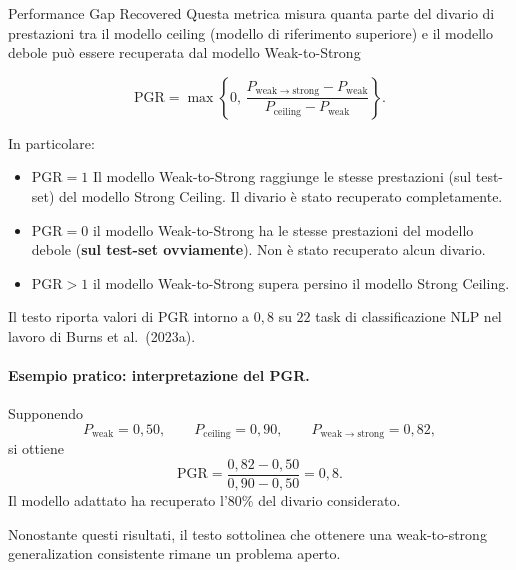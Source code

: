 \begin{definition}{Performance Gap Recovered}
Questa metrica misura quanta parte del divario di prestazioni tra il modello ceiling (modello di riferimento superiore) e il modello debole può essere recuperata dal modello Weak-to-Strong

\[
\mathrm{PGR}
=
\max\left\{
0,\,
\frac{
P_{\mathrm{weak}\rightarrow\mathrm{strong}}
-
P_{\mathrm{weak}}
}{
P_{\mathrm{ceiling}}
-
P_{\mathrm{weak}}
}
\right\}.
\tag{4.11}
\]
\end{definition}

In particolare:

\begin{itemize}
    \item $\mathrm{PGR}=1$ Il modello Weak-to-Strong raggiunge le stesse prestazioni (sul test-set) del modello Strong Ceiling. Il divario è stato recuperato completamente.

    \item $\mathrm{PGR}=0$ il modello Weak-to-Strong ha le stesse prestazioni del modello debole (\textbf{sul test-set ovviamente}). Non è stato recuperato alcun divario.
    
    \item $\mathrm{PGR}>1$ il modello Weak-to-Strong supera persino il modello Strong Ceiling.
\end{itemize}

Il testo riporta valori di PGR intorno a
$0{,}8$ su $22$ task di classificazione NLP
nel lavoro di Burns et al.\ (2023a).


\paragraph{Esempio pratico: interpretazione del PGR.}
Supponendo
\[
P_{\mathrm{weak}}=0{,}50,
\qquad
P_{\mathrm{ceiling}}=0{,}90,
\qquad
P_{\mathrm{weak}\rightarrow\mathrm{strong}}=0{,}82,
\]
si ottiene
\[
\mathrm{PGR}
=
\frac{0{,}82-0{,}50}{0{,}90-0{,}50}
=
0{,}8.
\]
Il modello adattato ha recuperato
l'$80\%$ del divario considerato.

Nonostante questi risultati,
il testo sottolinea che ottenere
una weak-to-strong generalization consistente
rimane un problema aperto.

\newpage


